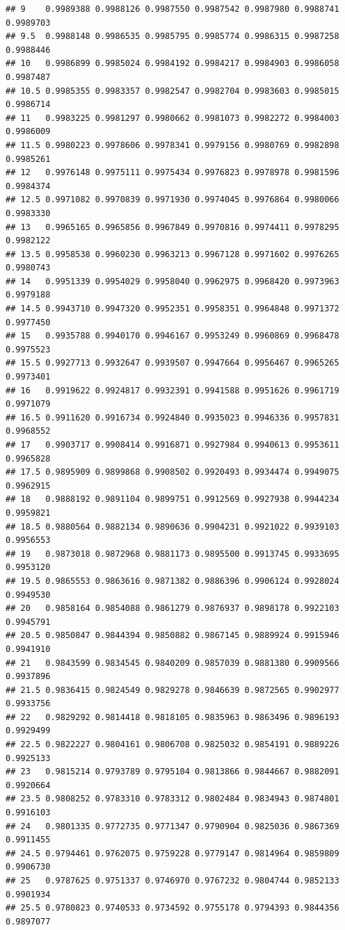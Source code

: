 \documentclass[
]{book}
\begin{document}
\begin{verbatim}
## 9    0.9989388 0.9988126 0.9987550 0.9987542 0.9987980 0.9988741 0.9989703
## 9.5  0.9988148 0.9986535 0.9985795 0.9985774 0.9986315 0.9987258 0.9988446
## 10   0.9986899 0.9985024 0.9984192 0.9984217 0.9984903 0.9986058 0.9987487
## 10.5 0.9985355 0.9983357 0.9982547 0.9982704 0.9983603 0.9985015 0.9986714
## 11   0.9983225 0.9981297 0.9980662 0.9981073 0.9982272 0.9984003 0.9986009
## 11.5 0.9980223 0.9978606 0.9978341 0.9979156 0.9980769 0.9982898 0.9985261
## 12   0.9976148 0.9975111 0.9975434 0.9976823 0.9978978 0.9981596 0.9984374
## 12.5 0.9971082 0.9970839 0.9971930 0.9974045 0.9976864 0.9980066 0.9983330
## 13   0.9965165 0.9965856 0.9967849 0.9970816 0.9974411 0.9978295 0.9982122
## 13.5 0.9958538 0.9960230 0.9963213 0.9967128 0.9971602 0.9976265 0.9980743
## 14   0.9951339 0.9954029 0.9958040 0.9962975 0.9968420 0.9973963 0.9979188
## 14.5 0.9943710 0.9947320 0.9952351 0.9958351 0.9964848 0.9971372 0.9977450
## 15   0.9935788 0.9940170 0.9946167 0.9953249 0.9960869 0.9968478 0.9975523
## 15.5 0.9927713 0.9932647 0.9939507 0.9947664 0.9956467 0.9965265 0.9973401
## 16   0.9919622 0.9924817 0.9932391 0.9941588 0.9951626 0.9961719 0.9971079
## 16.5 0.9911620 0.9916734 0.9924840 0.9935023 0.9946336 0.9957831 0.9968552
## 17   0.9903717 0.9908414 0.9916871 0.9927984 0.9940613 0.9953611 0.9965828
## 17.5 0.9895909 0.9899868 0.9908502 0.9920493 0.9934474 0.9949075 0.9962915
## 18   0.9888192 0.9891104 0.9899751 0.9912569 0.9927938 0.9944234 0.9959821
## 18.5 0.9880564 0.9882134 0.9890636 0.9904231 0.9921022 0.9939103 0.9956553
## 19   0.9873018 0.9872968 0.9881173 0.9895500 0.9913745 0.9933695 0.9953120
## 19.5 0.9865553 0.9863616 0.9871382 0.9886396 0.9906124 0.9928024 0.9949530
## 20   0.9858164 0.9854088 0.9861279 0.9876937 0.9898178 0.9922103 0.9945791
## 20.5 0.9850847 0.9844394 0.9850882 0.9867145 0.9889924 0.9915946 0.9941910
## 21   0.9843599 0.9834545 0.9840209 0.9857039 0.9881380 0.9909566 0.9937896
## 21.5 0.9836415 0.9824549 0.9829278 0.9846639 0.9872565 0.9902977 0.9933756
## 22   0.9829292 0.9814418 0.9818105 0.9835963 0.9863496 0.9896193 0.9929499
## 22.5 0.9822227 0.9804161 0.9806708 0.9825032 0.9854191 0.9889226 0.9925133
## 23   0.9815214 0.9793789 0.9795104 0.9813866 0.9844667 0.9882091 0.9920664
## 23.5 0.9808252 0.9783310 0.9783312 0.9802484 0.9834943 0.9874801 0.9916103
## 24   0.9801335 0.9772735 0.9771347 0.9790904 0.9825036 0.9867369 0.9911455
## 24.5 0.9794461 0.9762075 0.9759228 0.9779147 0.9814964 0.9859809 0.9906730
## 25   0.9787625 0.9751337 0.9746970 0.9767232 0.9804744 0.9852133 0.9901934
## 25.5 0.9780823 0.9740533 0.9734592 0.9755178 0.9794393 0.9844356 0.9897077

\end{verbatim}
\end{document}
